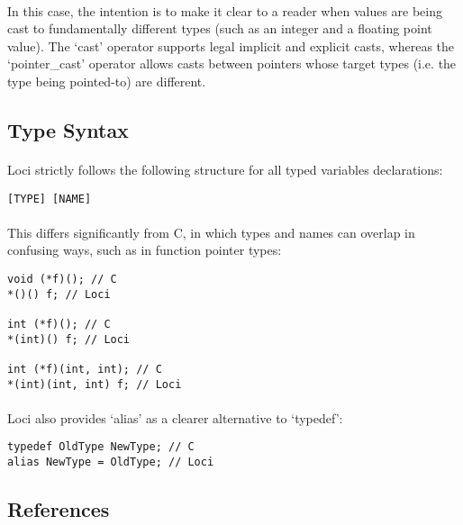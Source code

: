 \documentclass[12pt,twoside,notitlepage]{report}
\begin{document}
\paragraph{}
In this case, the intention is to make it clear to a reader when values are being cast to fundamentally different types (such as an integer and a floating point value). The `cast' operator supports legal implicit and explicit casts, whereas the `pointer\_cast' operator allows casts between pointers whose target types (i.e. the type being pointed-to) are different.

\subsection{Type Syntax}

\paragraph{}
Loci strictly follows the following structure for all typed variables declarations:

\begin{verbatim}
[TYPE] [NAME]
\end{verbatim}

\paragraph{}
This differs significantly from C, in which types and names can overlap in confusing ways, such as in function pointer types:

\begin{verbatim}
void (*f)(); // C
*()() f; // Loci

int (*f)(); // C
*(int)() f; // Loci

int (*f)(int, int); // C
*(int)(int, int) f; // Loci
\end{verbatim}

\paragraph{}
Loci also provides `alias' as a clearer alternative to `typedef':

\begin{verbatim}
typedef OldType NewType; // C
alias NewType = OldType; // Loci
\end{verbatim}

\subsection{References}
\end{document}
